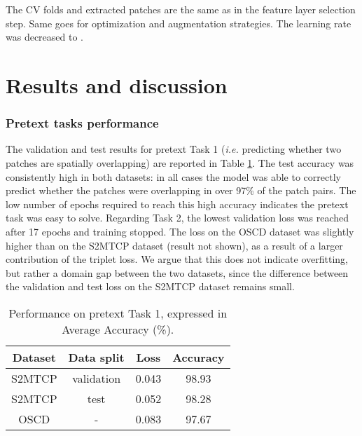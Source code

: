 \documentclass[runningheads]{llncs}
\begin{document}
The CV folds and extracted patches are the same as in the feature layer selection step. Same goes for optimization and augmentation strategies. The learning rate was decreased to . 
\section{Results and discussion}

\subsubsection{Pretext tasks performance} 
The validation and test results for pretext Task 1 (\emph{i.e.} predicting whether two patches are spatially overlapping) are reported in Table \ref{tab:results_pretexttask1}. The test accuracy was consistently high in both datasets: in all cases the model was able to correctly predict whether the patches were overlapping in over 97\% of the patch pairs. The low number of epochs required to reach this high accuracy indicates the pretext task was easy to solve. 
Regarding Task 2,  the lowest validation loss was reached after 17 epochs and training stopped. The loss on the OSCD dataset was slightly higher than on the S2MTCP dataset (result not shown), as a result of a larger contribution of the triplet loss. We argue that this does not indicate overfitting, but rather a domain gap between the two datasets, since the difference between the validation and test loss on the S2MTCP dataset remains small. 

\begin{table}
\caption{Performance on pretext Task 1, expressed in {Average} Accuracy (\%).}
\centering
\begin{tabular}{c|c|c|c} \hline
Dataset & Data split & Loss & Accuracy \\ \hline \hline
S2MTCP & validation & 0.043 & 98.93 \\
S2MTCP & test & 0.052 & 98.28 \\ 
OSCD & - & 0.083 & 97.67 \\
\hline
\end{tabular}
\label{tab:results_pretexttask1}
\end{table}
\end{document}
